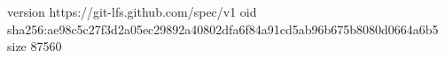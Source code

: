 version https://git-lfs.github.com/spec/v1
oid sha256:ae98c5c27f3d2a05ec29892a40802dfa6f84a91cd5ab96b675b8080d0664a6b5
size 87560

